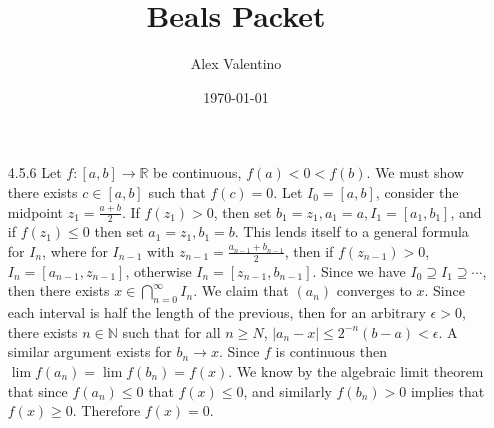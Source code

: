 \documentclass[12pt, letterpaper]{article}
\date{\today}
\author{Alex Valentino}
\title{Beals Packet}
\newcommand{\N}{\mathbb{N}}
\newcommand{\R}{\mathbb{R}}
\begin{document}
\begin{enumerate}
	\item[4.5.6] 
	Let $f: [a,b] \to \R$ be continuous, $f(a) < 0 < f(b)$.  We must show there
	exists $c \in [a,b]$ such that $f(c) = 0$.  Let $I_0 = [a,b]$, consider the
	midpoint $z_1 = \frac{a+b}{2}$.  If $f(z_1) > 0$, then set 
	$b_1 = z_1, a_1 = a, I_1 = [a_1, b_1]$, and if $f(z_1) \leq 0$ then set 
	$a_1 = z_1, b_1 = b$.  This lends itself to a general formula for $I_n$, 
	where for $I_{n-1}$ with $z_{n-1} = \frac{a_{n-1} + b_{n-1}}{2}$, then
	if $f(z_{n-1}) > 0$, $I_n = [a_{n-1}, z_{n-1}]$, otherwise 
	$I_n = [z_{n-1}, b_{n-1}]$.  Since we have $I_0 \supseteq I_1 \supseteq \cdots$, then there exists $x \in \bigcap_{n=0}^\infty I_n$. We claim that $(a_n)$
	converges to $x$.  Since each interval is half the length of the previous, then for an arbitrary $\epsilon > 0$, there exists $n \in \N$ such that for all 
	$n \geq N$, $|a_n - x| \leq 2^{-n}(b-a) < \epsilon$.  
	A similar argument exists for $b_n \to x$.  Since $f$ is continuous then 
	$\lim f(a_n) = \lim f(b_n) = f(x)$.  We know by the algebraic limit theorem
	that since $f(a_n) \leq 0$ that $f(x) \leq 0$, and similarly $f(b_n) > 0$ 
	implies that $f(x) \geq 0$.  Therefore $f(x) = 0$.  
\end{enumerate}
\end{document}
